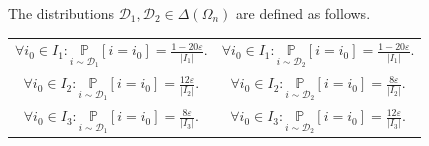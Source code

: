 \documentclass[10pt,a4paper]{article}
\begin{document}
The distributions $\mathcal{D}_{1}, \mathcal{D}_{2}\in \Delta(\Omega_{n})$ are defined as follows.
\begin{center}
\begin{tabular}{ c c }
 $\forall i_{0} \in I_{1}: \underset{i\sim \mathcal{D}_{1}}{\mathbb{P}}\left [i=i_{0}\right ]=\frac{1-20\varepsilon}{|I_{1}|}.$ & $\forall i_{0} \in I_{1}: \underset{i\sim \mathcal{D}_{2}}{\mathbb{P}}\left [i=i_{0}\right ]=\frac{1-20\varepsilon}{|I_{1}|}.$ \\
 $\forall i_{0} \in I_{2}: \underset{i\sim \mathcal{D}_{1}}{\mathbb{P}}\left [i=i_{0}\right ]=\frac{12\varepsilon}{|I_{2}|}.$ & $\forall i_{0} \in I_{2}: \underset{i\sim \mathcal{D}_{2}}{\mathbb{P}}\left [i=i_{0}\right ]=\frac{8\varepsilon}{|I_{2}|}.$ \\ 
 $\forall i_{0} \in I_{3}: \underset{i\sim \mathcal{D}_{1}}{\mathbb{P}}\left [i=i_{0}\right ]=\frac{8\varepsilon}{|I_{3}|}.$ & $\forall i_{0} \in I_{3}: \underset{i\sim \mathcal{D}_{2}}{\mathbb{P}}\left [i=i_{0}\right ]=\frac{12\varepsilon}{|I_{3}|}.$ 
\end{tabular}
\end{center}
\end{document}
